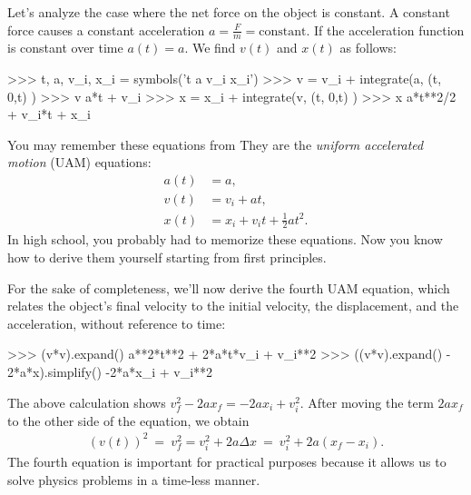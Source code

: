 Let's analyze the case where the net force on the object is constant.
A constant force causes a constant acceleration $a = \frac{F}{m} = \textrm{constant}$.
If the acceleration function is constant over time $a(t)=a$.
We find $v(t)$ and $x(t)$ as follows:
\small
\begin{verbatimtab}
>>> t, a, v_i, x_i = symbols('t a v_i x_i')
>>> v = v_i + integrate(a, (t, 0,t) )
>>> v
a*t + v_i
>>> x = x_i + integrate(v, (t, 0,t) )
>>> x
a*t**2/2 + v_i*t + x_i
\end{verbatimtab}
\normalsize

\noindent
You may remember these equations from 
They are the \emph{uniform accelerated motion} (UAM) equations:
\begin{align*}
 a(t) &= a,                                  \\ 
 v(t) &= v_i  + at,                          \\[-2mm] 
 x(t) &= x_i + v_it + \frac{1}{2}at^2.
\end{align*}
In high school, you probably had to memorize these equations.
Now you know how to derive them yourself starting from first principles.

For the sake of completeness, we'll now derive the fourth UAM equation,
which relates the object's final velocity to the initial velocity,
the displacement, and the acceleration, without reference to time:
\small
\begin{verbatimtab}
>>> (v*v).expand()
a**2*t**2 + 2*a*t*v_i + v_i**2
>>> ((v*v).expand() - 2*a*x).simplify()
-2*a*x_i + v_i**2
\end{verbatimtab}
\normalsize

\noindent
The above calculation shows $v_f^2 - 2ax_f = -2ax_i + v_i^2$.
After moving the term $2ax_f$ to the other side of the equation, we obtain
\begin{align*}
 (v(t))^2 \ = \ v_f^2 =  v_i^2  + 2a\Delta x \ = \  v_i^2  + 2a(x_f-x_i).
\end{align*}  
The fourth equation is important for practical purposes
because it allows us to solve physics problems in a time-less manner. %


